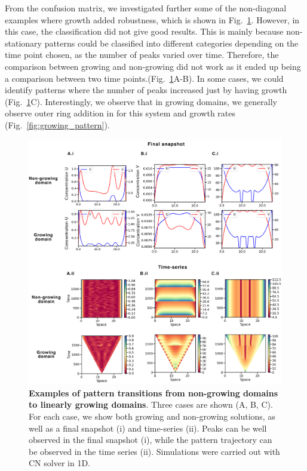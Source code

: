 From the confusion matrix, we investigated further some of the non-diagonal examples where growth added robustness, which is shown in Fig.~\ref{fig:interesting_cases_edgegrowth2}.
 However, in this case, the classification did not give good results.
This is mainly because non-stationary patterns could be classified into different categories depending on the time point chosen, as the number of peaks varied over time.
Therefore, the comparison between growing and non-growing did not work as it ended up being a comparison between two time points.(Fig.~\ref{fig:interesting_cases_edgegrowth2}A-B).
In some cases, we could identify patterns where the number of peaks increased just by having growth (Fig.~\ref{fig:interesting_cases_edgegrowth2}C).
Interestingly, we observe that in growing domains, we generally observe outer ring addition in for this system and growth rates (Fig.~\ref{fig:growing_pattern}).
\begin{figure}[H] %

    \centering
    \begin{adjustbox}{center}
        \includegraphics[width=1\textwidth]{chapters/Chapter 1/interesting_cases_edgegrowth2} %
    \end{adjustbox}
    \caption{\textbf{Examples of pattern transitions from non-growing domains to linearly growing domains}. Three cases are shown (A, B, C). For each case, we show both growing and non-growing solutions, as well as a final snapshot (i) and time-series (ii). Peaks can be well observed in the final snapshot (i), while the pattern trajectory can be observed in the time series (ii). Simulations were carried out with CN solver in 1D.}
    \label{fig:interesting_cases_edgegrowth2}
\end{figure}
